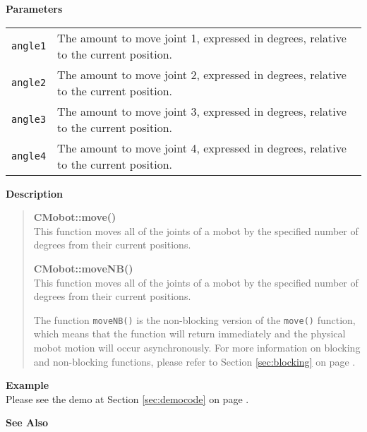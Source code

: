 \noindent
{\bf Parameters}\\
\vspace{-0.1in}
\begin{description}
\item               
\begin{tabular}{p{15 mm}p{125 mm}}
\texttt{angle1} & The amount to move joint 1, expressed in degrees, relative to the current position. \\
\texttt{angle2} & The amount to move joint 2, expressed in degrees, relative to the current position. \\
\texttt{angle3} & The amount to move joint 3, expressed in degrees, relative to the current position. \\
\texttt{angle4} & The amount to move joint 4, expressed in degrees, relative to the current position. \\
\end{tabular}
\end{description}
\noindent
{\bf Description}\\
\vspace{-12pt}
\begin{quote}
{\bf CMobot::move()}\\
This function moves all of the joints of a mobot by the specified number of degrees
from their current positions. 

\noindent
{\bf CMobot::moveNB()}\\
This function moves all of the joints of a mobot by the specified number of degrees
from their current positions. 

The function \texttt{moveNB()} is the non-blocking version of
the \texttt{move()} function, which means that the function will return
immediately and the physical mobot motion will occur asynchronously. For 
more information on blocking and non-blocking functions, please refer to 
Section \ref{sec:blocking} on page \pageref{sec:blocking}.\\
\end{quote}
\noindent
{\bf Example}\\
Please see the demo at Section \ref{sec:democode} on page \pageref{sec:democode}.\\
\noindent

\noindent
{\bf See Also}\\

